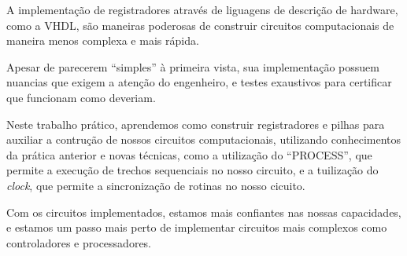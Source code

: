 \documentclass{article}
\begin{document}
A implementação de registradores através de liguagens de descrição de hardware, como a VHDL, são maneiras poderosas de construir circuitos computacionais de maneira menos complexa e mais rápida.

Apesar de parecerem ``simples'' à primeira vista, sua implementação possuem nuancias que exigem a atenção do engenheiro, e testes exaustivos para certificar que funcionam como deveriam.

Neste trabalho prático, aprendemos como construir registradores e pilhas para auxiliar a contrução de nossos circuitos computacionais, utilizando conhecimentos da prática anterior e novas técnicas, como a utilização do ``PROCESS'', que permite a execução de trechos sequenciais no nosso circuito, e a tuilização do \textit{clock},  que permite a sincronização de rotinas no nosso cicuito.

Com os circuitos implementados, estamos mais confiantes nas nossas capacidades, e estamos um passo mais perto de implementar circuitos mais complexos como controladores e processadores.
\end{document}
